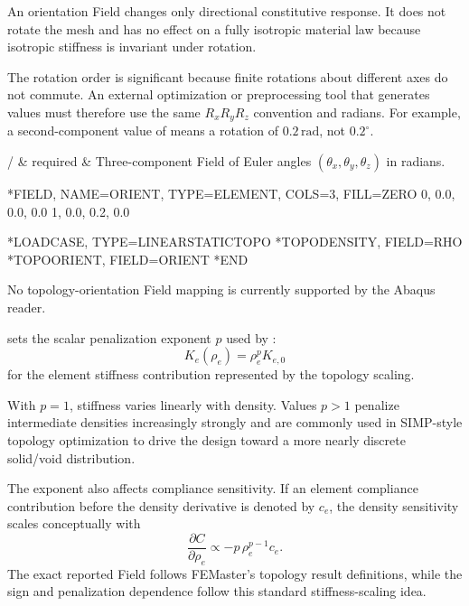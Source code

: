 An orientation Field changes only directional constitutive response. It does not rotate the mesh and has no effect on a fully isotropic material law because isotropic stiffness is invariant under rotation.

The rotation order is significant because finite rotations about different axes do not commute. An external optimization or preprocessing tool that generates  values must therefore use the same \(R_xR_yR_z\) convention and radians. For example, a second-component value of  means a rotation of \(0.2\,\mathrm{rad}\), not \(0.2^\circ\).

\begin{keywordparameters}
 /  & required & Three-component  Field of Euler angles \((\theta_x,\theta_y,\theta_z)\) in radians. \\
\end{keywordparameters}

\exampleheading
\begin{dialectexamples}
\begin{femasterdeck}
*FIELD, NAME=ORIENT,
 TYPE=ELEMENT, COLS=3, FILL=ZERO
0, 0.0, 0.0, 0.0
1, 0.0, 0.2, 0.0

*LOADCASE, TYPE=LINEARSTATICTOPO
*TOPODENSITY, FIELD=RHO
*TOPOORIENT, FIELD=ORIENT
*END
\end{femasterdeck}
\begin{noabaqus}
No topology-orientation Field mapping is currently supported by the Abaqus reader.
\end{noabaqus}
\end{dialectexamples}


 sets the scalar penalization exponent \(p\) used by :
\[
K_e(\rho_e)=\rho_e^p K_{e,0}
\]
for the element stiffness contribution represented by the topology scaling.

With \(p=1\), stiffness varies linearly with density. Values \(p>1\) penalize intermediate densities increasingly strongly and are commonly used in SIMP-style topology optimization to drive the design toward a more nearly discrete solid/void distribution.

The exponent also affects compliance sensitivity. If an element compliance contribution before the density derivative is denoted by \(c_e\), the density sensitivity scales conceptually with
\[
\frac{\partial C}{\partial\rho_e}
\propto -p\,\rho_e^{p-1}c_e.
\]
The exact reported Field follows FEMaster's topology result definitions, while the sign and penalization dependence follow this standard stiffness-scaling idea.

